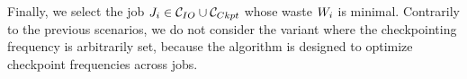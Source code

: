 Finally, we select the job $J_{i} \in \mathcal{C}_{IO} \cup \mathcal{C}_{Ckpt}$
whose waste $W_{i}$ is minimal.  Contrarily to the previous
scenarios, we do not consider the variant where the checkpointing
frequency is arbitrarily set, because the \leastwaste algorithm is
designed to optimize checkpoint frequencies across jobs.
